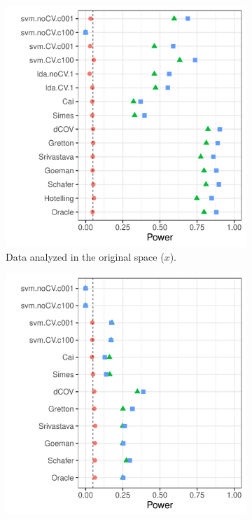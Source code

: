\documentclass[oupdraft]{bio}
\begin{document}
\begin{figure}[th]
	\centering
	\begin{subfigure}[t]{.45\columnwidth}
		\centering
		\includegraphics[width=1\columnwidth]{"art/file41"}
		\caption{Data analyzed in the original space ($x$).}
		\label{fig:interactions-in-original-space}
	\end{subfigure}
	\begin{subfigure}[t]{.45\columnwidth}
		\centering
		\includegraphics[width=1\columnwidth]{"art/file45"}

\end{subfigure}
\end{figure}
\end{document}
